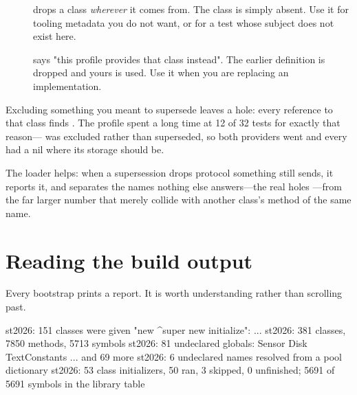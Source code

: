 \begin{description}
\item[] drops a class \emph{wherever} it comes from. The class
  is simply absent. Use it for tooling metadata you do not want, or for a test
  whose subject does not exist here.
\item[] says "this profile provides that class instead". The
  earlier definition is dropped and yours is used. Use it when you are
  replacing an implementation.
\end{description}

Excluding something you meant to supersede leaves a hole: every reference to
that class finds . The  profile spent a long time at
12 of 32 tests for exactly that reason--- was excluded rather
than superseded, so both providers went and every  had a nil where
its storage should be.

The loader helps: when a supersession drops protocol something still sends, it
reports it, and separates the names nothing else answers---the real holes
---from the far larger number that merely collide with another class's method
of the same name.

\section{Reading the build output}

Every bootstrap prints a report. It is worth understanding rather than
scrolling past.

\begin{plain}
st2026: 151 classes were given "new ^super new initialize": ...
st2026: 381 classes, 7850 methods, 5713 symbols
st2026: 81 undeclared globals: Sensor Disk TextConstants ... and 69 more
st2026: 6 undeclared names resolved from a pool dictionary
st2026: 53 class initializers, 50 ran, 3 skipped, 0 unfinished;
      5691 of 5691 symbols in the library table
\end{plain}

